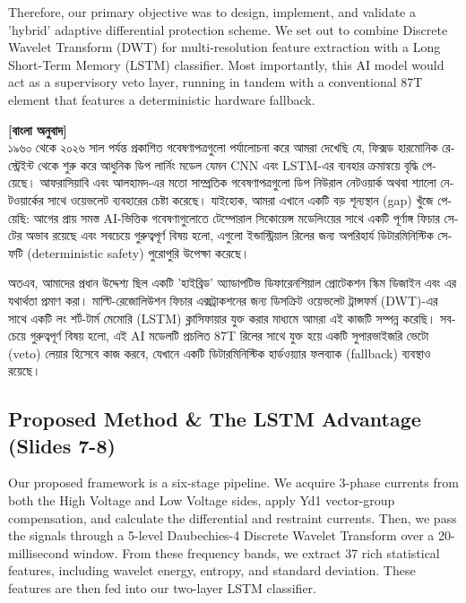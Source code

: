 \documentclass[12pt]{article}
\begin{document}
Therefore, our primary objective was to design, implement, and validate a 'hybrid' adaptive differential protection scheme. We set out to combine Discrete Wavelet Transform (DWT) for multi-resolution feature extraction with a Long Short-Term Memory (LSTM) classifier. Most importantly, this AI model would act as a supervisory veto layer, running in tandem with a conventional 87T element that features a deterministic hardware fallback.

\begin{bengali}
\textbf{[বাংলা অনুবাদ]} \\
১৯৬০ থেকে ২০২৬ সাল পর্যন্ত প্রকাশিত গবেষণাপত্রগুলো পর্যালোচনা করে আমরা দেখেছি যে, ফিক্সড হারমোনিক রেস্ট্রেইন্ট থেকে শুরু করে আধুনিক ডিপ লার্নিং মডেল যেমন CNN এবং LSTM-এর ব্যবহার ক্রমান্বয়ে বৃদ্ধি পেয়েছে। আফরাসিয়াবি এবং আলহামদ-এর মতো সাম্প্রতিক গবেষণাপত্রগুলো ডিপ নিউরাল নেটওয়ার্ক অথবা শ্যালো নেটওয়ার্কের সাথে ওয়েভলেট ব্যবহারের চেষ্টা করেছে। যাইহোক, আমরা এখানে একটি বড় শূন্যস্থান (gap) খুঁজে পেয়েছি: আগের প্রায় সমস্ত AI-ভিত্তিক গবেষণাগুলোতে টেম্পোরাল সিকোয়েন্স মডেলিংয়ের সাথে একটি পূর্ণাঙ্গ ফিচার সেটের অভাব রয়েছে এবং সবচেয়ে গুরুত্বপূর্ণ বিষয় হলো, এগুলো ইন্ডাস্ট্রিয়াল রিলের জন্য অপরিহার্য ডিটারমিনিস্টিক সেফটি (deterministic safety) পুরোপুরি উপেক্ষা করেছে।

অতএব, আমাদের প্রধান উদ্দেশ্য ছিল একটি 'হাইব্রিড' অ্যাডাপটিভ ডিফারেনশিয়াল প্রোটেকশন স্কিম ডিজাইন এবং এর যথার্থতা প্রমাণ করা। মাল্টি-রেজোলিউশন ফিচার এক্সট্রাকশনের জন্য ডিসক্রিট ওয়েভলেট ট্রান্সফর্ম (DWT)-এর সাথে একটি লং শর্ট-টার্ম মেমোরি (LSTM) ক্লাসিফায়ার যুক্ত করার মাধ্যমে আমরা এই কাজটি সম্পন্ন করেছি। সবচেয়ে গুরুত্বপূর্ণ বিষয় হলো, এই AI মডেলটি প্রচলিত 87T রিলের সাথে যুক্ত হয়ে একটি সুপারভাইজরি ভেটো (veto) লেয়ার হিসেবে কাজ করবে, যেখানে একটি ডিটারমিনিস্টিক হার্ডওয়্যার ফলব্যাক (fallback) ব্যবস্থাও রয়েছে।
\end{bengali}

\subsection*{Proposed Method \& The LSTM Advantage (Slides 7-8)}
Our proposed framework is a six-stage pipeline. We acquire 3-phase currents from both the High Voltage and Low Voltage sides, apply Yd1 vector-group compensation, and calculate the differential and restraint currents. Then, we pass the signals through a 5-level Daubechies-4 Discrete Wavelet Transform over a 20-millisecond window. From these frequency bands, we extract 37 rich statistical features, including wavelet energy, entropy, and standard deviation. These features are then fed into our two-layer LSTM classifier.
\end{document}
